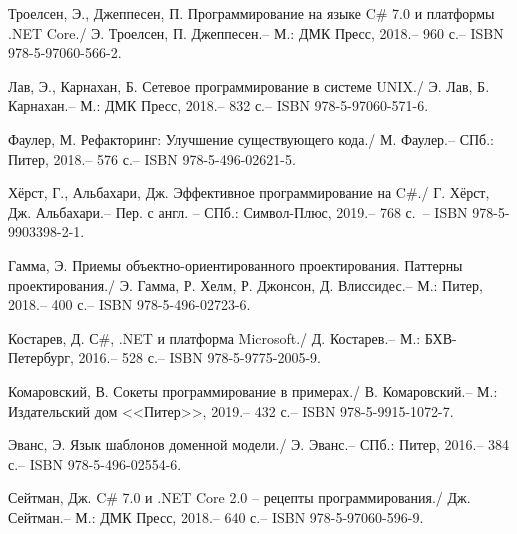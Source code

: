 \newsection
{}

\begin{thebibliography}{9}
    Троелсен, Э., Джеппесен, П. Программирование на языке C\# 7.0 и платформы .NET Core./ Э. Троелсен, П. Джеппесен.– М.: ДМК Пресс, 2018.– 960 с.– ISBN 978-5-97060-566-2.
    
    Лав, Э., Карнахан, Б. Сетевое программирование в системе UNIX./ Э. Лав, Б. Карнахан.– М.: ДМК Пресс, 2018.– 832 с.– ISBN 978-5-97060-571-6.
    
    Фаулер, М. Рефакторинг: Улучшение существующего кода./ М. Фаулер.– СПб.: Питер, 2018.– 576 с.– ISBN 978-5-496-02621-5.
    
    Хёрст, Г., Альбахари, Дж. Эффективное программирование на C\#./ Г. Хёрст, Дж. Альбахари.– Пер. с англ. – СПб.: Символ-Плюс, 2019.– 768 с.~– ISBN 978-5-9903398-2-1.
    
    Гамма, Э. Приемы объектно-ориентированного проектирования. Паттерны проектирования./ Э. Гамма, Р. Хелм, Р. Джонсон, Д. Влиссидес.– М.: Питер, 2018.– 400 с.– ISBN 978-5-496-02723-6.
    
    Костарев, Д. С\#, .NET и платформа Microsoft./ Д. Костарев.– М.: БХВ-Петербург, 2016.– 528 с.– ISBN 978-5-9775-2005-9.
    
    Комаровский, В. Сокеты программирование в примерах./ В. Комаровский.– М.: Издательский дом <<Питер>>, 2019.– 432 с.– ISBN 978-5-9915-1072-7.
    
    Эванс, Э. Язык шаблонов доменной модели./ Э. Эванс.– СПб.: Питер, 2016.– 384 с.– ISBN 978-5-496-02554-6.
    
    Сейтман, Дж. C\# 7.0 и .NET Core 2.0 – рецепты программирования./ Дж. Сейтман.– М.: ДМК Пресс, 2018.– 640 с.– ISBN 978-5-97060-596-9.
    
\end{thebibliography}

